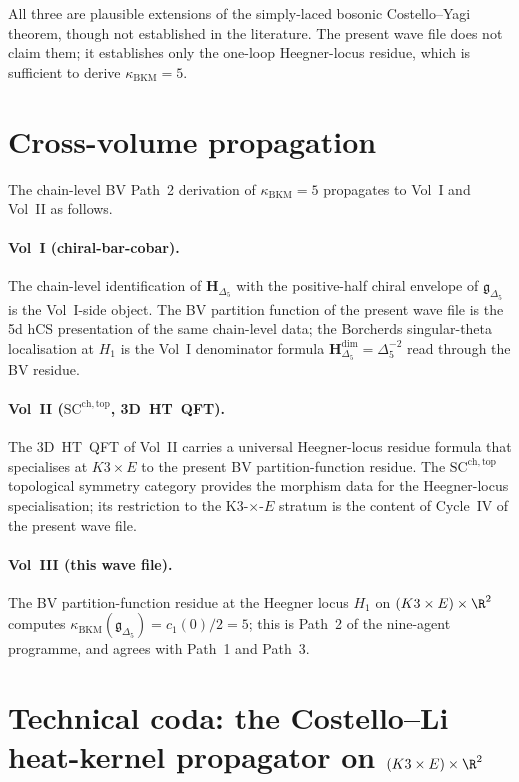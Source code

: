 All three are plausible extensions of the simply-laced bosonic
Costello--Yagi theorem, though not established in the literature. The
present wave file does not claim them; it establishes only the
one-loop Heegner-locus residue, which is sufficient to derive
$\kappa_{\mathrm{BKM}} = 5$.

\section*{Cross-volume propagation}

The chain-level BV Path~2 derivation of $\kappa_{\mathrm{BKM}} = 5$
propagates to Vol~I and Vol~II as follows.

\paragraph{Vol~I (chiral-bar-cobar).}
The chain-level identification of $\mathbf{H}_{\Delta_5}$ with the
positive-half chiral envelope of $\mathfrak{g}_{\Delta_5}$ is the
Vol~I-side object. The BV partition function of the present wave
file is the 5d hCS presentation of the same chain-level data; the
Borcherds singular-theta localisation at $H_1$ is the Vol~I
denominator formula $\mathbf{H}_{\Delta_5}^{\mathrm{dim}} =
\Delta_5^{-2}$ read through the BV residue.

\paragraph{Vol~II ($\mathrm{SC}^{\mathrm{ch, top}}$, 3D~HT~QFT).}
The 3D~HT~QFT of Vol~II carries a universal Heegner-locus residue
formula that specialises at $K3 \times E$ to the present BV
partition-function residue. The $\mathrm{SC}^{\mathrm{ch, top}}$
topological symmetry category provides the morphism data for the
Heegner-locus specialisation; its restriction to the K3-$\times$-$E$
stratum is the content of Cycle~IV of the present wave file.

\paragraph{Vol~III (this wave file).}
The BV partition-function residue at the Heegner locus $H_1$ on
$(K3 \times E) \times \R^2$ computes
$\kappa_{\mathrm{BKM}}(\mathfrak{g}_{\Delta_5}) = c_1(0)/2 = 5$;
this is Path~2 of the nine-agent programme, and agrees with Path~1
and Path~3.

\section*{Technical coda: the Costello--Li heat-kernel propagator on
$(K3 \times E) \times \R^2$}

